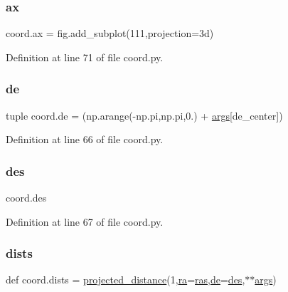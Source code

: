 \subsubsection{\texorpdfstring{ax}{ax}}
{\footnotesize\ttfamily coord.\+ax = fig.\+add\+\_\+subplot(111,projection=\textquotesingle{}3d\textquotesingle{})}



Definition at line 71 of file coord.\+py.

\mbox{\label{namespacecoord_a8dcc8c73e25f42279ad5b38825c9b285}} 
\subsubsection{\texorpdfstring{de}{de}}
{\footnotesize\ttfamily tuple coord.\+de = (np.\+arange(-\/np.\+pi,np.\+pi,0.) + \hyperlink{namespacecoord_a87ee5c40fe361f2c1bfbea4ed5086028}{args}\mbox{[}\textquotesingle{}de\+\_\+center\textquotesingle{}\mbox{]})}



Definition at line 66 of file coord.\+py.

\mbox{\label{namespacecoord_ae502575d54f9026dd1c6b0118fc65c63}} 
\subsubsection{\texorpdfstring{des}{des}}
{\footnotesize\ttfamily coord.\+des}



Definition at line 67 of file coord.\+py.

\mbox{\label{namespacecoord_a2314e07f943e13a24947dced6bee4b64}} 
\subsubsection{\texorpdfstring{dists}{dists}}
{\footnotesize\ttfamily def coord.\+dists = \hyperlink{namespacecoord_a46aebc3089e078f4597812fecdd0975f}{projected\+\_\+distance}(1,\hyperlink{namespacecoord_a9e8cb473ba5d9c7398020447b51174e0}{ra}=\hyperlink{namespacecoord_a5462056be5c33668cdc23bd703b745c5}{ras},\hyperlink{namespacecoord_a8dcc8c73e25f42279ad5b38825c9b285}{de}=\hyperlink{namespacecoord_ae502575d54f9026dd1c6b0118fc65c63}{des},$\ast$$\ast$\hyperlink{namespacecoord_a87ee5c40fe361f2c1bfbea4ed5086028}{args})}



